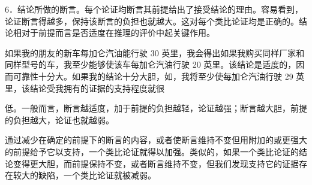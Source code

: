 6．结论所做的断言。每个论证均断言其前提给出了接受结论的理由。容易看到，论证断言得越多，保持该断言的负担也就越大。这对每个类比论证均是正确的。结论相对于前提而言是否适度在推理的评价中起关键作用。

如果我的朋友的新车每加仑汽油能行驶 30 英里，我会得出如果我购买同样厂家和同样型号的车，我至少能够使该车每加仑汽油行驶 20 英里。该结论是适度的，因而可靠性十分大。如果我的结论十分大胆，如，我将至少使每加仑汽油行驶 29 英里，该结论受我拥有的证据的支持程度就很

低。一般而言，断言越适度，加于前提的负担越轻，论证越强；断言越大胆，前提的负担越大，论证也就越弱。

通过减少在确定的前提下的断言的内容，或者使断言维持不变但用附加的或更强大的前提给予它以支持，一个类比论证就得以加强。类似的，如果一个类比论证的结论变得更大胆，而前提保持不变，或者断言维持不变，但我们发现支持它的证据存在较大的缺陷，一个类比论证就被减弱。 